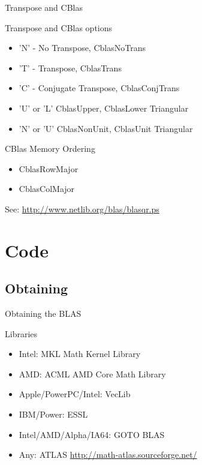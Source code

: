 \documentclass[handout]{beamer}
\begin{document}
\begin{frame}{Transpose and CBlas}
 \begin{block}{Transpose and CBlas options}
  \begin{itemize}
   \item 'N' - No Transpose, CblasNoTrans
   \item 'T' - Transpose, CblasTrans
   \item 'C' - Conjugate Transpose, CblasConjTrans
   \item 'U' or 'L' CblasUpper, CblasLower Triangular
   \item 'N' or 'U' CblasNonUnit, CblasUnit Triangular
  \end{itemize}
 \end{block}
 \begin{block}{CBlas Memory Ordering}
  \begin{itemize}
   \item CblasRowMajor
   \item CblasColMajor
  \end{itemize}
 \end{block}
 See: \url{http://www.netlib.org/blas/blasqr.ps}
\end{frame}

\section{Code}
\subsection{Obtaining}
\begin{frame}{Obtaining the BLAS}
\begin{block}{Libraries}
 \begin{itemize}
  \item Intel:  MKL Math Kernel Library 
  \item AMD: ACML AMD Core Math Library
  \item Apple/PowerPC/Intel: VecLib
  \item IBM/Power: ESSL
  \item Intel/AMD/Alpha/IA64: GOTO BLAS
  \item Any: ATLAS \url{http://math-atlas.sourceforge.net/}
 \end{itemize}
\end{block}
\end{frame}
\end{document}
